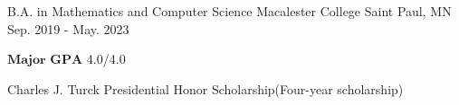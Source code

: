 

\begin{cventries}

  \cventry
    {B.A. in Mathematics and Computer Science} %
    {Macalester College} %
    {Saint Paul, MN} %
    {Sep. 2019 - May. 2023} %
    {
      \begin{cvitems} %
        \item {$\textbf{Major GPA }$4.0/4.0}
        \item {Charles J. Turck Presidential Honor Scholarship(Four-year scholarship)}
      \end{cvitems}
    }

\end{cventries}
